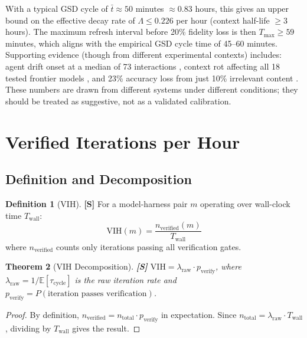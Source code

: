 \documentclass[11pt,a4paper]{article}
\newtheorem{theorem}{Theorem}[section]
\theoremstyle{definition}
\newtheorem{definition}[theorem]{Definition}
\theoremstyle{remark}
\newcommand{\VIH}{\mathrm{VIH}}
\newcommand{\E}{\mathbb{E}}
\begin{document}
With a typical GSD cycle of $\bar{t} \approx 50$ minutes $\approx 0.83$ hours, this gives an upper bound on the effective decay rate of $\Lambda \leq 0.226$ per hour (context half-life $\geq 3$ hours). The maximum refresh interval before 20\% fidelity loss is then $T_{\max} \geq 59$ minutes, which aligns with the empirical GSD cycle time of 45--60 minutes. Supporting evidence (though from different experimental contexts) includes: agent drift onset at a median of 73 interactions \citep{agentdrift2026}, context rot affecting all 18 tested frontier models \citep{chroma2025rot}, and 23\% accuracy loss from just 10\% irrelevant content \citep{chroma2025rot}. These numbers are drawn from different systems under different conditions; they should be treated as suggestive, not as a validated calibration.


\section{Verified Iterations per Hour}\label{sec:vih}

\subsection{Definition and Decomposition}

\begin{definition}[VIH]\label{def:vih}
\textbf{[S]} For a model-harness pair $m$ operating over wall-clock time $T_{\mathrm{wall}}$:
\[
    \VIH(m) = \frac{n_{\mathrm{verified}}(m)}{T_{\mathrm{wall}}}
\]
where $n_{\mathrm{verified}}$ counts only iterations passing all verification gates.
\end{definition}

\begin{theorem}[VIH Decomposition]\label{thm:vih-decomp}
\textbf{[S]} $\VIH = \lambda_{\mathrm{raw}} \cdot p_{\mathrm{verify}}$, where $\lambda_{\mathrm{raw}} = 1/\E[\tau_{\mathrm{cycle}}]$ is the raw iteration rate and $p_{\mathrm{verify}} = P(\text{iteration passes verification})$.
\end{theorem}

\begin{proof}
By definition, $n_{\mathrm{verified}} = n_{\mathrm{total}} \cdot p_{\mathrm{verify}}$ in expectation. Since $n_{\mathrm{total}} = \lambda_{\mathrm{raw}} \cdot T_{\mathrm{wall}}$, dividing by $T_{\mathrm{wall}}$ gives the result.
\end{proof}
\end{document}
